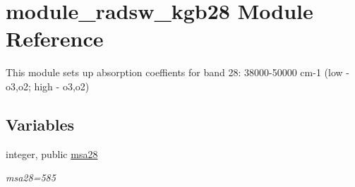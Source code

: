 \hypertarget{namespacemodule__radsw__kgb28}{}\section{module\+\_\+radsw\+\_\+kgb28 Module Reference}
\label{namespacemodule__radsw__kgb28}


This module sets up absorption coeffients for band 28\+: 38000-\/50000 cm-\/1 (low -\/ o3,o2; high -\/ o3,o2)  


\subsection*{Variables}
\begin{DoxyCompactItemize}
\item 
\mbox{\label{namespacemodule__radsw__kgb28_a32c6693eb82a3ed47ed13e07f526471a}} 
integer, public \hyperlink{namespacemodule__radsw__kgb28_a32c6693eb82a3ed47ed13e07f526471a}{msa28}
\begin{DoxyCompactList}\small\item\em msa28=585 \end{DoxyCompactList}\end{DoxyCompactItemize}
